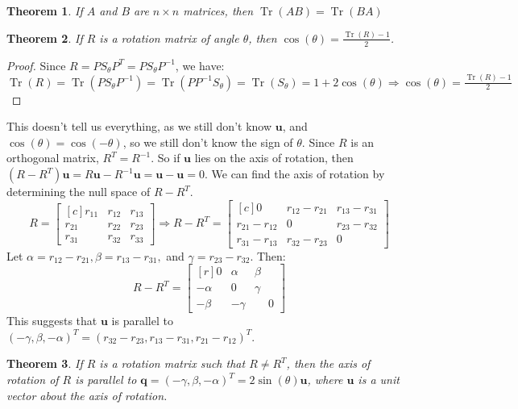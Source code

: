\documentclass[oneside]{book}
\theoremstyle{mystyle}
\newtheorem{theorem}{Theorem}[section]
\DeclareMathOperator{\Tr}{Tr}
\begin{document}
\begin{theorem}
If $A$ and $B$ are $n\times n$ matrices, then $\Tr(AB) = \Tr(BA)$
\end{theorem}
\begin{theorem}
If $R$ is a rotation matrix of angle $\theta$, then $\cos(\theta) = \frac{\Tr(R) - 1}{2}$.
\end{theorem}
\begin{proof}
Since $R = PS_{\theta} P^T = PS_{\theta}P^{-1}$, we have:
\begin{equation*}
    \Tr(R) = \Tr(PS_{\theta}P^{-1}) = \Tr(PP^{-1}S_{\theta}) = \Tr(S_{\theta}) = 1+2\cos(\theta)\Rightarrow \cos(\theta) = \tfrac{\Tr(R)-1}{2}
\end{equation*}
\end{proof}
This doesn't tell us everything, as we still don't know $\mathbf{u}$, and $\cos(\theta) = \cos(-\theta)$, so we still don't know the sign of $\theta$. Since $R$ is an orthogonal matrix, $R^T = R^{-1}$. So if $\mathbf{u}$ lies on the axis of rotation, then $(R-R^T)\mathbf{u} = R\mathbf{u}-R^{-1}\mathbf{u} = \mathbf{u}-\mathbf{u} = 0$. We can find the axis of rotation by determining the null space of $R-R^T$. 
\begin{equation*}
    R = \begin{bmatrix*}[c] r_{11} & r_{12} & r_{13} \\ r_{21} & r_{22} & r_{23} \\ r_{31} & r_{32} & r_{33} \end{bmatrix*} \Rightarrow R-R^{T} = \begin{bmatrix*}[c] 0 & r_{12} - r_{21} & r_{13} - r_{31} \\ r_{21} - r_{12} & 0 & r_{23}-r_{32} \\ r_{31} - r_{13} & r_{32} - r_{23} & 0 \end{bmatrix*}
\end{equation*}
Let $\alpha = r_{12} - r_{21},\beta = r_{13} - r_{31},$ and $\gamma = r_{23}-r_{32}$. Then:
\begin{equation*}
    R-R^T = \begin{bmatrix*}[r] 0 & \alpha & \beta \\ -\alpha & 0 & \gamma \\ -\beta & -\gamma & \phantom{-}0 \end{bmatrix*}
\end{equation*}
This suggests that $\mathbf{u}$ is parallel to $(-\gamma, \beta, -\alpha)^{T} = (r_{32}-r_{23}, r_{13}-r_{31}, r_{21}-r_{12})^{T}$.
\begin{theorem}
If $R$ is a rotation matrix such that $R\ne R^T$, then the axis of rotation of $R$ is parallel to $\mathbf{q}=(-\gamma, \beta, -\alpha)^{T} = 2\sin(\theta)\mathbf{u}$, where $\mathbf{u}$ is a unit vector about the axis of rotation.
\end{theorem}
\end{document}
